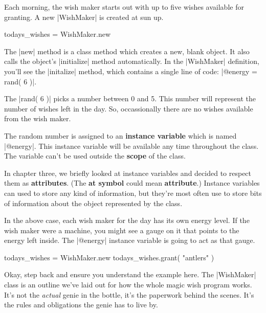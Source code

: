 \documentclass[12pt,twoside]{report}
\begin{document}
Each morning, the wish maker starts out with up to five wishes
available for granting. A new \rubyinline|WishMaker|
is created at sun up.


\begin{rubycode}

 todays_wishes = WishMaker.new

\end{rubycode}


The \rubyinline|new| method is a class method which
creates a new, blank object.  It also calls the object's
\rubyinline|initialize| method automatically.  In the
\rubyinline|WishMaker| definition, you'll see the
\rubyinline|initalize| method, which contains a single
line of code: \rubyinline|@energy = rand( 6 )|.

The \rubyinline|rand( 6 )| picks a number between 0
and 5.  This number will represent the number of wishes left in the
day.  So, occassionally there are no wishes available from the wish
maker.

The random number is assigned to an {\bf instance variable} which is
named \rubyinline|@energy|. This instance variable
will be available any time throughout the class.  The variable can't
be used outside the {\bf scope} of the class.

In chapter three, we briefly looked at instance variables and decided
to respect them as {\bf attributes}.  (The {\bf at symbol} could mean
{\bf attribute}.)  Instance variables can used to store any kind of
information, but they're most often use to store bits of information
about the object represented by the class.

In the above case, each wish maker for the day has its own energy
level.  If the wish maker were a machine, you might see a gauge on it
that points to the energy left inside. The
\rubyinline|@energy| instance variable is going to act
as that gauge.


\begin{rubycode}

 todays_wishes = WishMaker.new 
 todays_wishes.grant( "antlers" )

\end{rubycode}


Okay, step back and ensure you understand the example here.  The
\rubyinline|WishMaker| class is an outline we've laid
out for how the whole magic wish program works.  It's not the {\em
  actual} genie in the bottle, it's the paperwork behind the scenes.
It's the rules and obligations the genie has to live by.
\end{document}
